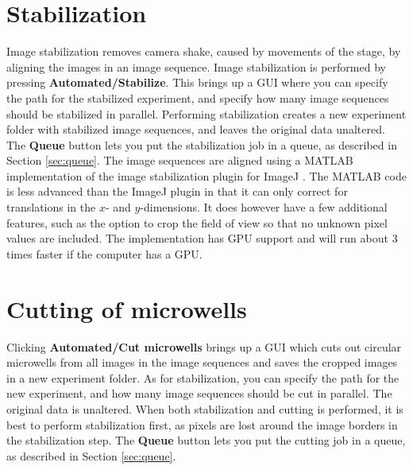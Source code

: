 \documentclass[a4paper, oneside, onecolumn, 11pt]{article}
\newcommand{\menu}[1]{\textbf{#1}}
\newcommand{\control}[1]{\textbf{#1}}
\begin{document}
\section{Stabilization}
\label{sec:stabilization}
Image stabilization removes camera shake, caused by movements of the stage, by aligning the images in an image sequence. Image stabilization is performed by pressing \menu{Automated/\allowbreak Stabilize}. This brings up a GUI where you can specify the path for the stabilized experiment, and specify how many image sequences should be stabilized in parallel. Performing stabilization creates a new experiment folder with stabilized image sequences, and leaves the original data unaltered. The \control{Queue} button lets you put the stabilization job in a queue, as described in Section \ref{sec:queue}. The image sequences are aligned using a MATLAB implementation of the image stabilization plugin for ImageJ \cite{Li08Stabilizer}. The MATLAB code is less advanced than the ImageJ plugin in that it can only correct for translations in the $x$- and $y$-dimensions. It does however have a few additional features, such as the option to crop the field of view so that no unknown pixel values are included. The implementation has GPU support and will run about 3 times faster if the computer has a GPU.

\section{Cutting of microwells}
Clicking \menu{Automated/\allowbreak Cut microwells} brings up a GUI which cuts out circular microwells from all images in the image sequences and saves the cropped images in a new experiment folder. As for stabilization, you can specify the path for the new experiment, and how many image sequences should be cut in parallel. The original data is unaltered. When both stabilization and cutting is performed, it is best to perform stabilization first, as pixels are lost around the image borders in the stabilization step. The \control{Queue} button lets you put the cutting job in a queue, as described in Section \ref{sec:queue}.
\end{document}
